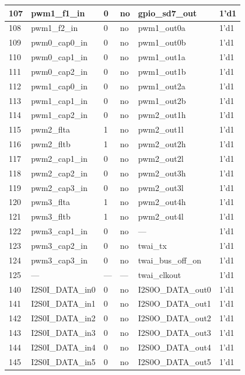 \begin{longtable}[c]{|p{1cm}|p{3.3cm}|p{1.5cm}|p{2.4cm}|p{4.3cm}|p{2.5cm}| }
    107 & pwm1\_f1\_in & 0 & no & gpio\_sd7\_out & 1'd1 \\ \hline
    108 & pwm1\_f2\_in & 0 & no & pwm1\_out0a & 1'd1 \\ \hline
    109 & pwm0\_cap0\_in & 0 & no & pwm1\_out0b & 1'd1 \\ \hline
    110 & pwm0\_cap1\_in & 0 & no & pwm1\_out1a & 1'd1 \\ \hline
    111 & pwm0\_cap2\_in & 0 & no & pwm1\_out1b & 1'd1 \\ \hline
    112 & pwm1\_cap0\_in & 0 & no & pwm1\_out2a & 1'd1 \\ \hline
    113 & pwm1\_cap1\_in & 0 & no & pwm1\_out2b & 1'd1 \\ \hline
    114 & pwm1\_cap2\_in & 0 & no & pwm2\_out1h & 1'd1 \\ \hline
    115 & pwm2\_flta & 1 & no & pwm2\_out1l & 1'd1 \\ \hline
    116 & pwm2\_fltb & 1 & no & pwm2\_out2h & 1'd1 \\ \hline
    117 & pwm2\_cap1\_in & 0 & no & pwm2\_out2l & 1'd1 \\ \hline
    118 & pwm2\_cap2\_in & 0 & no & pwm2\_out3h & 1'd1 \\ \hline
    119 & pwm2\_cap3\_in & 0 & no & pwm2\_out3l & 1'd1 \\ \hline
    120 & pwm3\_flta & 1 & no & pwm2\_out4h & 1'd1 \\ \hline
    121 & pwm3\_fltb & 1 & no & pwm2\_out4l & 1'd1 \\ \hline
    122 & pwm3\_cap1\_in & 0 & no & --- & 1'd1 \\ \hline
    123 & pwm3\_cap2\_in & 0 & no & twai\_tx & 1'd1 \\ \hline
    124 & pwm3\_cap3\_in & 0 & no & twai\_bus\_off\_on & 1'd1 \\ \hline
    125 & --- & --- & --- & twai\_clkout & 1'd1 \\ \hline
    140 & I2S0I\_DATA\_in0 & 0 & no & I2S0O\_DATA\_out0 & 1'd1 \\ \hline
    141 & I2S0I\_DATA\_in1 & 0 & no & I2S0O\_DATA\_out1 & 1'd1 \\ \hline
    142 & I2S0I\_DATA\_in2 & 0 & no & I2S0O\_DATA\_out2 & 1'd1 \\ \hline
    143 & I2S0I\_DATA\_in3 & 0 & no & I2S0O\_DATA\_out3 & 1'd1 \\ \hline
    144 & I2S0I\_DATA\_in4 & 0 & no & I2S0O\_DATA\_out4 & 1'd1 \\ \hline
    145 & I2S0I\_DATA\_in5 & 0 & no & I2S0O\_DATA\_out5 & 1'd1 \\ \hline

\end{longtable}
